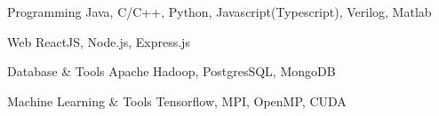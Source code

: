 


\begin{cvskills}

\cvskill
{Programming} %
{Java, C/C++, Python, Javascript(Typescript), Verilog, Matlab} %


\cvskill
{Web} %
{ReactJS, Node.js, Express.js} %


\cvskill
{Database \& Tools} %
{Apache Hadoop, PostgresSQL, MongoDB} %


\cvskill
{Machine Learning \& Tools} %
{Tensorflow, MPI, OpenMP, CUDA } %

\end{cvskills}